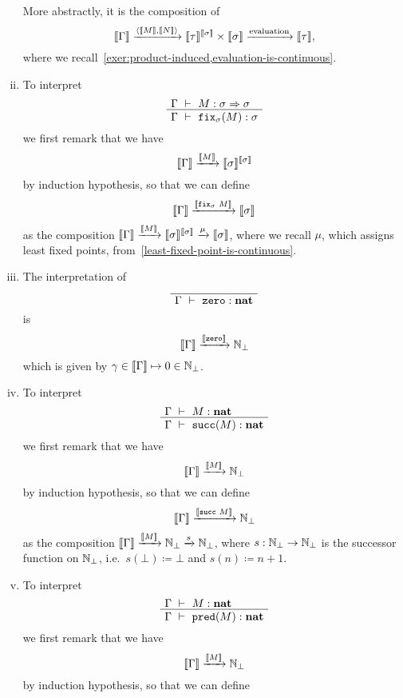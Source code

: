 \begin{definition}
\begin{enumerate}[(i)]
    More abstractly, it is the composition of
    \[
      \llbracket\Gamma\rrbracket \xrightarrow{\langle \llbracket M\rrbracket , \llbracket N\rrbracket \rangle}
      \llbracket\tau\rrbracket^{\llbracket\sigma\rrbracket} \times \llbracket\sigma\rrbracket
      \xrightarrow{\text{evaluation}}
      \llbracket\tau\rrbracket,
    \]
    where we recall~\cref{exer:product-induced,evaluation-is-continuous}.
  \item
    To interpret
    \[
      \def\fCenter{\ \vdash\ }
      \Axiom$\Gamma \fCenter M : \sigma \pcffun \sigma$
      \UnaryInf$\Gamma \fCenter \pcffix_\sigma(M) : \sigma$ \DisplayProof
    \]
    we first remark that we have
    \[
      \llbracket\Gamma\rrbracket \xrightarrow{\llbracket M\rrbracket} \llbracket\sigma\rrbracket^{\llbracket\sigma\rrbracket}
    \]
    by induction hypothesis, so that we can define
    \[
      \llbracket\Gamma\rrbracket \xrightarrow{\llbracket\operatorname{\mathtt{fix}}_\sigma\,M\rrbracket} \llbracket\sigma\rrbracket
    \]
    as the composition
    \(\llbracket\Gamma\rrbracket \xrightarrow{\llbracket M\rrbracket} \llbracket\sigma\rrbracket^{\llbracket\sigma\rrbracket}
    \xrightarrow{\mu} \llbracket\sigma\rrbracket\), where we recall \(\mu\), which assigns
    least fixed points, from~\cref{least-fixed-point-is-continuous}.
  \item
    The interpretation of
    \[
      \def\fCenter{\ \vdash\ }
      \AxiomC{}
      \UnaryInf$\Gamma \fCenter \pcfzero : \pcfnat$
      \DisplayProof
    \]
    is
    \[
      \llbracket\Gamma\rrbracket \xrightarrow{\llbracket\mathtt{zero}\rrbracket} \mathbb N_\bot
    \]
    which is given by \(\gamma \in \llbracket\Gamma\rrbracket \mapsto 0 \in \mathbb N_\bot\).
  \item\label{def:interpretation-succ}
    To interpret
    \[
      \def\fCenter{\ \vdash\ }
      \Axiom$\Gamma \fCenter M : \pcfnat$
      \UnaryInf$\Gamma \fCenter \pcfsuc(M) : \pcfnat$
      \DisplayProof
    \]
    we first remark that we have
    \[
      \llbracket\Gamma\rrbracket \xrightarrow{\llbracket M\rrbracket} \mathbb N_\bot
    \]
    by induction hypothesis, so that we can define
    \[
      \llbracket\Gamma\rrbracket \xrightarrow{\llbracket\operatorname{\mathtt{succ}}\,M\rrbracket} \mathbb N_\bot
    \]
    as the composition
    \(\llbracket\Gamma\rrbracket \xrightarrow{\llbracket M\rrbracket} \mathbb N_\bot \xrightarrow{s}
    \mathbb N_\bot\), where \(s : \mathbb N_\bot \to \mathbb N_\bot\) is the successor function
    on \(\mathbb N_\bot\), i.e.\ \(s(\bot) \coloneqq \bot\) and
    \(s(n) \coloneqq n+1\).
  \item\label{def:interpretation-pred}
    To interpret
    \[
      \def\fCenter{\ \vdash\ }
      \Axiom$\Gamma \fCenter M : \pcfnat$
      \UnaryInf$\Gamma \fCenter \pcfpred(M) : \pcfnat$
      \DisplayProof
    \]
    we first remark that we have
    \[
      \llbracket\Gamma\rrbracket \xrightarrow{\llbracket M\rrbracket} \mathbb N_\bot
    \]
    by induction hypothesis, so that we can define

\end{enumerate}
\end{definition}
